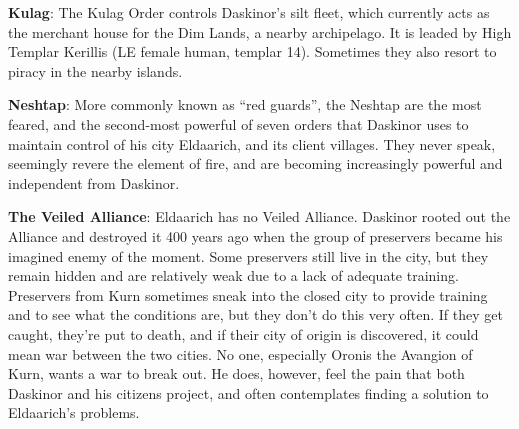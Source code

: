 {
	\textbf{Kulag}: The Kulag Order controls Daskinor's silt fleet, which currently acts as the merchant house for the Dim Lands, a nearby archipelago. It is leaded by High Templar Kerillis (LE female human, templar 14). Sometimes they also resort to piracy in the nearby islands.

	\textbf{Neshtap}: More commonly known as ``red guards'', the Neshtap are the most feared, and the second-most powerful of seven orders that Daskinor uses to maintain control of his city Eldaarich, and its client villages. They never speak, seemingly revere the element of fire, and are becoming increasingly powerful and independent from Daskinor.

	\textbf{The Veiled Alliance}: Eldaarich has no Veiled Alliance. Daskinor rooted out the Alliance and destroyed it 400 years ago when the group of preservers became his imagined enemy of the moment. Some preservers still live in the city, but they remain hidden and are relatively weak due to a lack of adequate training. Preservers from Kurn sometimes sneak into the closed city to provide training and to see what the conditions are, but they don't do this very often. If they get caught, they're put to death, and if their city of origin is discovered, it could mean war between the two cities. No one, especially Oronis the Avangion of Kurn, wants a war to break out. He does, however, feel the pain that both Daskinor and his citizens project, and often contemplates finding a solution to Eldaarich's problems.
}
{}{}
